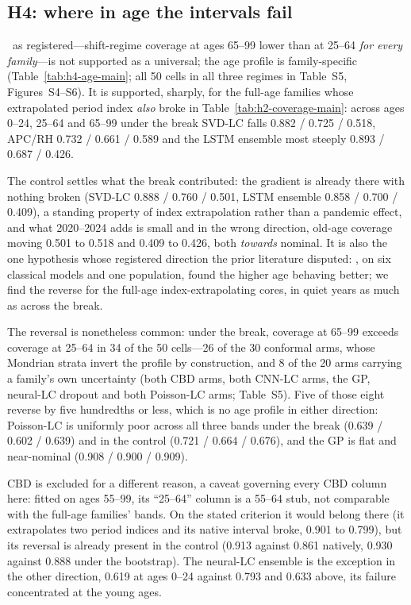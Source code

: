 \subsection{H4: where in age the intervals fail}
\label{sec:results-age}


\Hfour\ as registered---shift-regime coverage at ages 65--99 lower than at
25--64 \emph{for every family}---is not supported as a universal; the age
profile is family-specific (Table~\ref{tab:h4-age-main}; all 50 cells in all
three regimes in Table~S5, Figures~S4--S6). It is supported, sharply, for the
full-age families whose extrapolated period index \emph{also} broke in
Table~\ref{tab:h2-coverage-main}: across ages 0--24, 25--64 and 65--99 under the
break SVD-LC falls 0.882 / 0.725 / 0.518, APC/RH 0.732 / 0.661 / 0.589 and the
LSTM ensemble most steeply 0.893 / 0.687 / 0.426.

The control settles what the break contributed: the gradient is already there
with nothing broken (SVD-LC 0.888 / 0.760 / 0.501, LSTM ensemble
0.858 / 0.700 / 0.409), a standing property of index extrapolation rather than a
pandemic effect, and what 2020--2024 adds is small and in the wrong direction,
old-age coverage moving 0.501 to 0.518 and 0.409 to 0.426, both \emph{towards}
nominal. It is also the one hypothesis whose registered direction the prior
literature disputed: \citet{dowd2010backtesting}, on six classical models and
one population, found the higher age behaving better; we find the reverse for
the full-age index-extrapolating cores, in quiet years as much as across the
break.

The reversal is nonetheless common: under the break, coverage at 65--99 exceeds
coverage at 25--64 in 34 of the 50 cells---26 of the 30 conformal arms, whose
Mondrian strata invert the profile by construction, and 8 of the 20 arms
carrying a family's own uncertainty (both CBD arms, both CNN-LC arms, the GP,
neural-LC dropout and both Poisson-LC arms; Table~S5). Five of those eight
reverse by five hundredths or less, which is no age profile in either direction:
Poisson-LC is uniformly poor across all three bands under the break
(0.639 / 0.602 / 0.639) and in the control (0.721 / 0.664 / 0.676), and the GP
is flat and near-nominal (0.908 / 0.900 / 0.909).

CBD is excluded for a different reason, a caveat governing every CBD column
here: fitted on ages 55--99, its ``25--64'' column is a 55--64 stub, not
comparable with the full-age families' bands. On the stated criterion it would
belong there (it extrapolates two period indices and its native interval broke,
0.901 to 0.799), but its reversal is already present in the control (0.913
against 0.861 natively, 0.930 against 0.888 under the bootstrap). The neural-LC
ensemble is the exception in the other direction, 0.619 at ages 0--24 against
0.793 and 0.633 above, its failure concentrated at the young ages.

